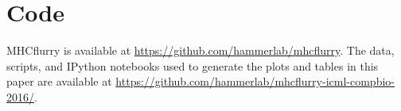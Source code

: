 \section{Code}
MHCflurry is available at \href{https://github.com/hammerlab/mhcflurry}{https://github.com/hammerlab/mhcflurry}. The data, scripts, and IPython\cite{Perez_2007} notebooks used to generate the plots and tables in this paper are available at \href{https://github.com/hammerlab/mhcflurry-icml-compbio-2016}{https://github.com/hammerlab/mhcflurry-icml-compbio-2016/}. 